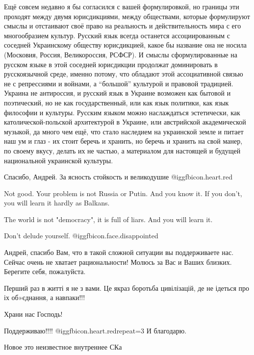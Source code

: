 \begin{itemize}

Ещё совсем недавно я бы согласился с вашей формулировкой, но границы эти
проходят между двумя юрисдикциями, между обществами, которые формулируют смыслы
и отстаивают своё право на реальность и действительность мира с его
многообразием культур. Русский язык всегда останется ассоциированным с соседней
Украинскому обществу юрисдикцией, какое бы название она не носила (Московия,
Россия, Великороссия, РСФСР). И смыслы сформулированные на русском языке в этой
соседней юрисдикции продолжат доминировать в русскоязычной среде, именно
потому, что обладают этой ассоциативной связью не с репрессиями и войнами, а
\enquote{большой} культурой и правовой традицией. Украина не антироссия, и русский язык
в Украине возможен как бытовой и поэтический, но не как государственный, или
как язык политики, как язык философии и культуры. Русским языком можно
наслаждаться эстетически, как католической-польской архитектурой в Украине, или
австрийской академической музыкой, да много чем ещё, что стало наследием на
украинской земле и питает наш ум и глаз - их стоит беречь и хранить, но беречь
и хранить на свой манер, по своему вкусу, делать их не частью, а материалом для
настоящей и будущей национальной украинской культуры.

Спасибо, Андрей. За ясность стойкость и великодушие @igg{fbicon.heart.red}


Not good. Your problem is not Russia or Putin. And you know it. If you don't,
you will learn it hardly as Balkans.

The world is not "democracy", it is full of liars. And you will learn it.

Don't delude yourself.  @igg{fbicon.face.disappointed} 


Андрей, спасибо Вам, что в такой сложной ситуации вы поддерживаете нас. Сейчас
очень не хватает рациональности! Молюсь за Вас и Ваших близких. Берегите себя,
пожалуйста.

Перший раз в житті я не з вами. Це якраз боротьба цивілізацій, де не ідеться про іх об»єднання, а навпаки!!!

Храни нас Господь!

Поддерживаю!!!! @igg{fbicon.heart.red}{repeat=3}
И благодарю.

Новое это неизвестное внутреннее СКа


\end{itemize}
